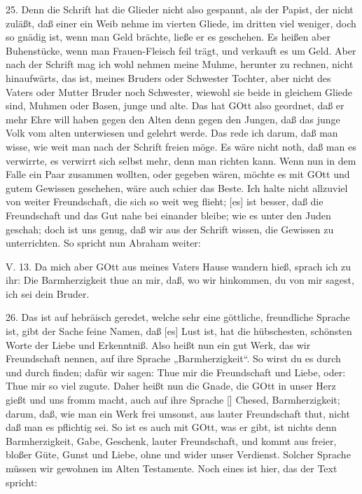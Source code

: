 25. Denn die Schrift hat die Glieder nicht also gespannt, als der Papist, der nicht zuläßt, daß einer ein Weib nehme im vierten Gliede, im dritten viel weniger, doch so gnädig ist, wenn man Geld brächte, ließe er es geschehen. Es heißen aber Buhenstücke, wenn man Frauen-Fleisch feil trägt, und verkauft es um Geld. Aber nach der Schrift mag ich wohl nehmen meine Muhme, herunter zu rechnen, nicht hinaufwärts, das ist, meines Bruders oder Schwester Tochter, aber nicht des Vaters oder Mutter Bruder noch Schwester, wiewohl sie beide in gleichem Gliede sind, Muhmen oder Basen, junge und alte. Das hat GOtt also geordnet, daß er mehr Ehre will haben gegen den Alten denn gegen den Jungen, daß das junge Volk vom alten unterwiesen und gelehrt werde. Das rede ich darum, daß man wisse, wie weit man nach der Schrift freien möge. Es wäre nicht noth, daß man es verwirrte, es verwirrt sich selbst mehr, denn man richten kann. Wenn nun in dem Falle ein Paar zusammen wollten, oder gegeben
wären, möchte es mit GOtt und gutem Gewissen geschehen, wäre auch schier das Beste. Ich halte nicht allzuviel von weiter Freundschaft, die sich so weit weg flieht; [es] ist besser, daß die Freundschaft und das Gut nahe bei einander bleibe; wie es unter den Juden geschah; doch ist uns genug, daß wir aus der Schrift wissen, die Gewissen zu unterrichten. So spricht nun Abraham weiter:

\begin{schriftzitat}
V. 13. Da mich aber GOtt aus meines Vaters Hause wandern hieß, sprach ich zu ihr: Die Barmherzigkeit thue an mir, daß, wo wir hinkommen, du von mir sagest, ich sei dein Bruder.
\end{schriftzitat}

26. Das ist auf hebräisch geredet, welche sehr eine göttliche, freundliche Sprache ist, gibt der Sache feine Namen, daß [es] Lust ist, hat die hübschesten, schönsten Worte der Liebe und Erkenntniß. Also heißt nun ein gut Werk, das wir Freundschaft nennen, auf ihre Sprache „Barmherzigkeit“. So wirst du es durch und durch finden; dafür wir sagen: Thue mir die Freundschaft und Liebe, oder: Thue mir so viel zugute. Daher heißt nun die Gnade, die GOtt in unser Herz gießt und uns fromm macht, auch auf ihre Sprache [] Chesed, Barmherzigkeit; darum, daß, wie man ein Werk frei umsonst, aus lauter Freundschaft thut, nicht daß man es pflichtig sei. So ist es auch mit GOtt, was er gibt, ist nichts denn Barmherzigkeit, Gabe, Geschenk, lauter Freundschaft, und kommt aus freier, bloßer Güte, Gunst und Liebe, ohne und wider unser Verdienst. Solcher Sprache müssen wir gewohnen im Alten Testamente. Noch eines ist hier, das der Text spricht:

